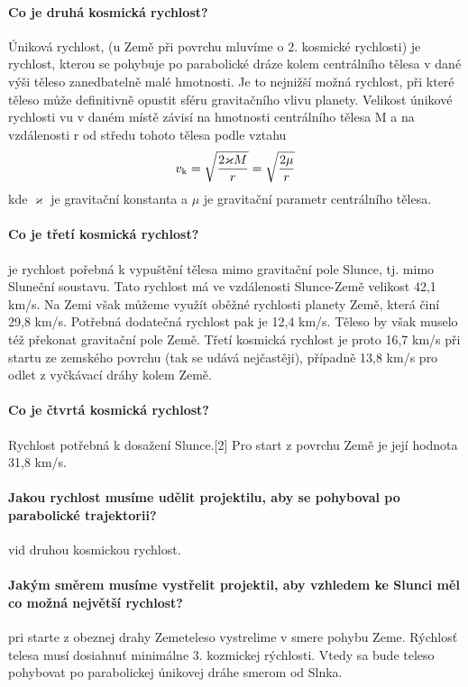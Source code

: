\documentclass[11pt,a4paper,notitlepage,twocolumn]{article}
\begin{document}
\paragraph{Co je druhá kosmická rychlost?}
Úniková rychlost, (u Země při povrchu mluvíme o 2. kosmické rychlosti) je rychlost, 
kterou se pohybuje po parabolické dráze kolem centrálního tělesa v dané výši těleso 
zanedbatelně malé hmotnosti. Je to nejnižší možná rychlost, při které těleso může definitivně
opustit sféru gravitačního vlivu planety.
Velikost únikové rychlosti vu v daném místě závisí na hmotnosti centrálního 
tělesa M a na vzdálenosti r od středu tohoto tělesa podle vztahu
\[ v_{\rm k} = \sqrt \frac{ 2\varkappa M }{r} = \sqrt \frac{2\mu}{r} \]
kde $ \varkappa $ je gravitační konstanta a $ \mu $ je gravitační parametr centrálního tělesa.

\paragraph{Co je třetí kosmická rychlost?}
je rychlost pořebná k vypuštění tělesa mimo gravitační pole Slunce, tj. mimo Sluneční soustavu. Tato rychlost má ve vzdálenosti Slunce-Země velikost 42,1 km/s. Na Zemi však můžeme využít oběžné rychlosti planety Země, která činí 29,8 km/s. Potřebná dodatečná rychlost pak je 12,4 km/s. Těleso by však muselo též překonat gravitační pole Země. Třetí kosmická rychlost je proto 16,7 km/s při startu ze zemského povrchu (tak se udává nejčastěji), případně 13,8 km/s pro odlet z vyčkávací dráhy kolem Země.

\paragraph{Co je čtvrtá kosmická rychlost?}
Rychlost potřebná k dosažení Slunce.[2] Pro start z povrchu Země je její hodnota 31,8 km/s.
\paragraph{Jakou rychlost musíme udělit projektilu, aby se pohyboval po parabolické trajektorii?}
vid druhou kosmickou rychlost.
\paragraph{Jakým směrem musíme vystřelit projektil, aby vzhledem ke Slunci měl co možná největší rychlost?}
pri starte z obeznej drahy Zemeteleso vystrelime v smere pohybu Zeme. Rýchlosť
telesa musí dosiahnuť minimálne 3. kozmickej rýchlosti. Vtedy sa bude teleso pohybovat po parabolickej únikovej dráhe smerom od Slnka.
\end{document}
